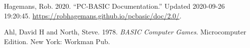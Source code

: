 \begin{itemlist}
\item Hagemans, Rob. 2020. ``PC-BASIC Documentation.'' Updated 2020-09-26 19:20:45. \url{https://robhagemans.github.io/pcbasic/doc/2.0/}.
\item Ahl, David H and North, Steve. 1978. \emph{BASIC Computer Games}. Microcomputer Edition. New York: Workman Pub.
\end{itemlist}
